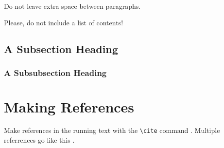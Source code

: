 \documentclass{article}
\begin{document}
  Do not leave extra space between paragraphs.
  
  Please, do not include a list of contents!  


  \subsection{A Subsection Heading}


  \subsubsection{A Subsubsection Heading}


  \section{Making References}

  Make references in the running text with the \verb+\cite+
  command \cite{dijkstra68}. Multiple referrences go like this
  \cite{charniak85,steels98}.




\end{document}
